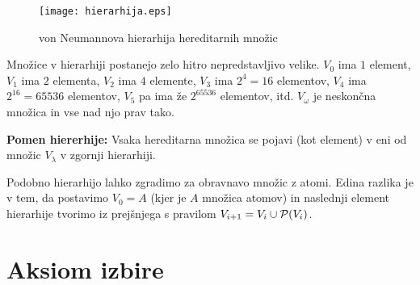 \documentclass[11pt,paper=b5,footinclude,headinclude]{scrbook} %
\def\sledi {{~\Rightarrow~}}
\begin{document}
\begin{figure}[h!]
\begin{center}
\texttt{[image: hierarhija.eps]}
\caption{von Neumannova hierarhija hereditarnih množic}
\end{center}
\end{figure}

Množice v hierarhiji postanejo zelo hitro nepredstavljivo velike.
$V_0$ ima $1$ element, $V_1$ ima $2$ elementa, $V_2$ ima $4$ elemente, $V_3$ ima $2^4 = 16$ elementov,
$V_4$ ima $2^{16} = 65536$ elementov, $V_5$ pa ima že $2^{65536}$ elementov, itd.
$V_\omega$ je neskončna množica in vse nad njo prav tako.

\textbf{ Pomen hiererhije:}
Vsaka hereditarna  množica se pojavi (kot element) v eni od množic $V_\lambda$ v zgornji hierarhiji.

Podobno hierarhijo lahko zgradimo za obravnavo množic z atomi. Edina razlika je v tem, da
postavimo $V_0 = A$ (kjer je $A$ množica atomov)
in naslednji element hierarhije tvorimo iz prejšnjega s pravilom $V_{i+1} = V_i\cup {\cal P}(V_i)$.

\newpage

\chapter{Aksiom izbire}


%
%
%
%
%
\end{document}
